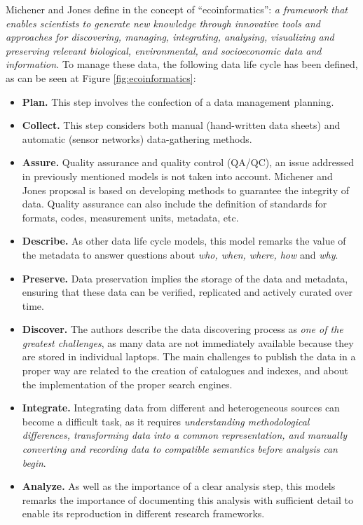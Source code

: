 Michener and Jones define in \cite{michener_ecoinformatics:_2012} the concept of ``ecoinformatics'': \textit{a framework that enables scientists to generate new knowledge through innovative tools and approaches for discovering, managing, integrating, analysing, visualizing and preserving relevant biological, environmental, and socioeconomic data and information.} To manage these data, the following data life cycle has been defined, as can be seen at Figure \ref{fig:ecoinformatics}:
\begin{itemize}
    \item \textbf{Plan.} This step involves the confection of a data management planning.
    \item \textbf{Collect.} This step considers both manual (hand-written data sheets) and automatic (sensor networks) data-gathering methods.
    \item \textbf{Assure.} Quality assurance and quality control (QA/QC), an issue addressed in previously mentioned models is not taken into account. Michener and Jones proposal is based on developing methods to guarantee the integrity of  data. Quality assurance can also include the definition of standards for formats, codes, measurement units, metadata, etc.
    \item \textbf{Describe.} As other data life cycle models, this model remarks the value of the metadata to answer questions about \textit{who, when, where, how} and \textit{why}.
    \item \textbf{Preserve.} Data preservation implies the storage of the data and metadata, ensuring that these data can be verified, replicated and actively curated over time.
    \item \textbf{Discover.} The authors describe the data discovering process as \textit{one of the greatest challenges}, as many data are not immediately available because they are stored in individual laptops. The main challenges to publish the data in a proper way are related to the creation of catalogues and indexes, and about the implementation of the proper search engines.
    \item \textbf{Integrate.} Integrating data from different and heterogeneous sources can become a difficult task, as it requires \textit{understanding methodological differences, transforming data into a common representation, and manually converting and recording data to compatible semantics before analysis can begin}.
    \item \textbf{Analyze.} As well as the importance of a clear analysis step, this models remarks the importance of documenting this analysis with sufficient detail to enable its reproduction in different research frameworks.
\end{itemize}

